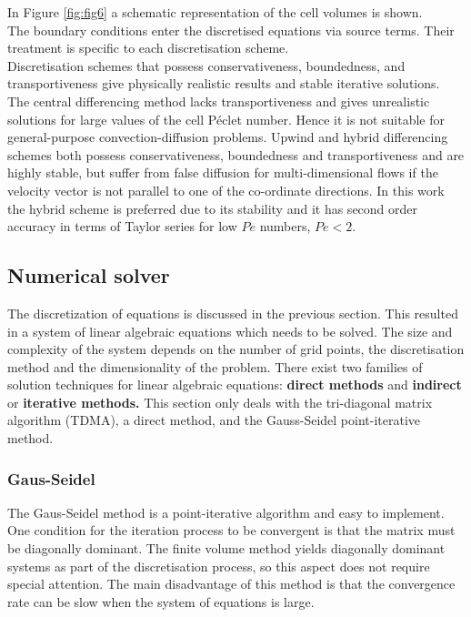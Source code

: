 In Figure \ref{fig:fig6} a schematic representation of the cell volumes is shown. \\

The boundary conditions enter the discretised equations via source terms. Their treatment is specific to each discretisation scheme. \\

Discretisation schemes that possess conservativeness, boundedness, and transportiveness give physically realistic results and stable iterative solutions. The central differencing method lacks transportiveness and gives unrealistic solutions for large values of the cell P\'eclet number. Hence it is not suitable for general-purpose convection-diffusion problems. Upwind and hybrid differencing schemes both possess conservativeness, boundedness and transportiveness and are highly stable, but suffer from false diffusion for multi-dimensional flows if the velocity vector is not parallel to one of the co-ordinate directions. In this work the hybrid scheme is preferred due to its stability and it has second order accuracy in terms of Taylor series for low $Pe$ numbers, $Pe < 2$.
 
\subsection{Numerical solver}
The discretization of equations is discussed in the previous section. This resulted in a system of linear algebraic equations which needs to be solved. The size and complexity of the system depends on the number of grid points, the discretisation method and the dimensionality of the problem. There exist two families of solution techniques for linear algebraic equations: \textbf{direct methods} and \textbf{indirect} or \textbf{iterative methods.}  %
This section only deals with the tri-diagonal matrix algorithm (TDMA), a direct method, and the Gauss-Seidel point-iterative method.  

\subsubsection{Gaus-Seidel}
The Gaus-Seidel method is a point-iterative algorithm and easy to implement. One condition for the iteration process to be convergent is that the matrix must be diagonally dominant. The finite volume method yields diagonally dominant systems as part of the discretisation process, so this aspect does not require special attention. The main disadvantage of this method is that the convergence rate can be slow when the system of equations is large. 

